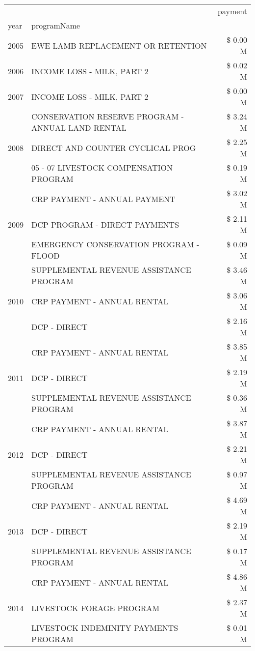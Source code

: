 \begin{tabular}{llr}
\toprule
 &  & payment \\
year & programName &  \\
\midrule
2005 & EWE LAMB REPLACEMENT OR RETENTION & \$ 0.00 M \\
\cline{1-3}
2006 & INCOME LOSS - MILK, PART 2 & \$ 0.02 M \\
\cline{1-3}
2007 & INCOME LOSS - MILK, PART 2 & \$ 0.00 M \\
\cline{1-3}
\multirow[t]{3}{*}{2008} & CONSERVATION RESERVE PROGRAM - ANNUAL LAND RENTAL & \$ 3.24 M \\
 & DIRECT AND COUNTER CYCLICAL PROG & \$ 2.25 M \\
 & 05 - 07 LIVESTOCK COMPENSATION PROGRAM & \$ 0.19 M \\
\cline{1-3}
\multirow[t]{3}{*}{2009} & CRP PAYMENT - ANNUAL PAYMENT & \$ 3.02 M \\
 & DCP PROGRAM - DIRECT PAYMENTS & \$ 2.11 M \\
 & EMERGENCY CONSERVATION PROGRAM - FLOOD & \$ 0.09 M \\
\cline{1-3}
\multirow[t]{3}{*}{2010} & SUPPLEMENTAL REVENUE ASSISTANCE PROGRAM & \$ 3.46 M \\
 & CRP PAYMENT - ANNUAL RENTAL & \$ 3.06 M \\
 & DCP - DIRECT & \$ 2.16 M \\
\cline{1-3}
\multirow[t]{3}{*}{2011} & CRP PAYMENT - ANNUAL RENTAL & \$ 3.85 M \\
 & DCP - DIRECT & \$ 2.19 M \\
 & SUPPLEMENTAL REVENUE ASSISTANCE PROGRAM & \$ 0.36 M \\
\cline{1-3}
\multirow[t]{3}{*}{2012} & CRP PAYMENT - ANNUAL RENTAL & \$ 3.87 M \\
 & DCP - DIRECT & \$ 2.21 M \\
 & SUPPLEMENTAL REVENUE ASSISTANCE PROGRAM & \$ 0.97 M \\
\cline{1-3}
\multirow[t]{3}{*}{2013} & CRP PAYMENT - ANNUAL RENTAL & \$ 4.69 M \\
 & DCP - DIRECT & \$ 2.19 M \\
 & SUPPLEMENTAL REVENUE ASSISTANCE PROGRAM & \$ 0.17 M \\
\cline{1-3}
\multirow[t]{3}{*}{2014} & CRP PAYMENT - ANNUAL RENTAL & \$ 4.86 M \\
 & LIVESTOCK FORAGE PROGRAM & \$ 2.37 M \\
 & LIVESTOCK INDEMINITY PAYMENTS PROGRAM & \$ 0.01 M \\

\end{tabular}
